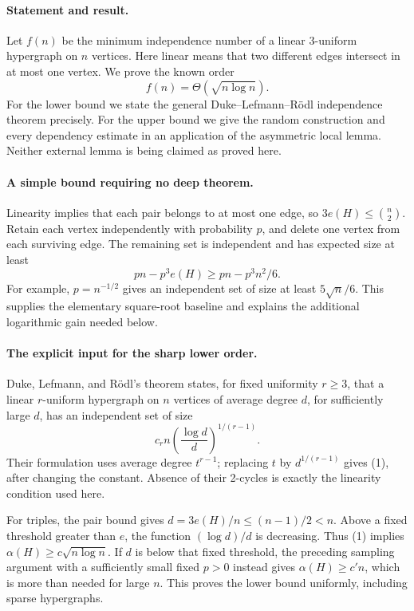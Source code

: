 \paragraph{Statement and result.}
Let \(f(n)\) be the minimum independence number of a linear 3-uniform hypergraph on \(n\) vertices. Here linear means that two different edges intersect in at most one vertex. We prove the known order
\[
 f(n)=\Theta(\sqrt{n\log n}).
\]
For the lower bound we state the general Duke--Lefmann--R\"odl independence theorem precisely. For the upper bound we give the random construction and every dependency estimate in an application of the asymmetric local lemma. Neither external lemma is being claimed as proved here.

\paragraph{A simple bound requiring no deep theorem.}
Linearity implies that each pair belongs to at most one edge, so
\(3e(H)\leq\binom n2\). Retain each vertex independently with probability \(p\), and delete one vertex from each surviving edge. The remaining set is independent and has expected size at least
\[
 pn-p^3e(H)\geq pn-p^3n^2/6.
\]
For example, \(p=n^{-1/2}\) gives an independent set of size at least \(5\sqrt n/6\). This supplies the elementary square-root baseline and explains the additional logarithmic gain needed below.

\paragraph{The explicit input for the sharp lower order.}
Duke, Lefmann, and R\"odl's theorem states, for fixed uniformity \(r\geq3\), that a linear \(r\)-uniform hypergraph on \(n\) vertices of average degree \(d\), for sufficiently large \(d\), has an independent set of size
\[
 c_r n\left(\frac{\log d}{d}\right)^{1/(r-1)}. \tag{1}
\]
Their formulation uses average degree \(t^{r-1}\); replacing \(t\) by \(d^{1/(r-1)}\) gives (1), after changing the constant. Absence of their 2-cycles is exactly the linearity condition used here.

For triples, the pair bound gives \(d=3e(H)/n\leq(n-1)/2<n\). Above a fixed threshold greater than \(e\), the function \((\log d)/d\) is decreasing. Thus (1) implies
\(\alpha(H)\geq c\sqrt{n\log n}\).
If \(d\) is below that fixed threshold, the preceding sampling argument with a sufficiently small fixed \(p>0\) instead gives \(\alpha(H)\geq c'n\), which is more than needed for large \(n\). This proves the lower bound uniformly, including sparse hypergraphs.

